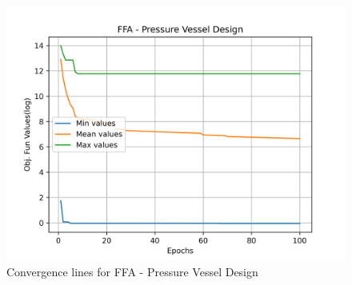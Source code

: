 \begin{figure}[H]
        \centering
        \caption{Convergence lines for FFA - Pressure Vessel Design}
        \label{fig:pressure_vessel_problem_solve_ffa}
        \includegraphics[scale=0.5]{images/pressure_vessel_problem_solve_ffa.png}
        \end{figure}
        